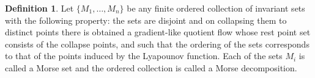 \documentclass{scrartcl}
\theoremstyle{definition}
\newtheorem{definition}{Definition}
\theoremstyle{remark}
\begin{document}
\begin{definition}
Let $\{M_1, \dots, M_n\}$ be any finite ordered collection of invariant sets with the following property: the sets are disjoint and on collapsing them to distinct points there is obtained a gradient-like quotient flow whose rest point set consists of the collapse points, and such that the ordering of the sets corresponds to that of the points induced by the Lyapounov function.
 Each of the sets $M_i$ is called a Morse set and the ordered collection is called a Morse decomposition.
\end{definition}




 \newpage
 
 
\end{document}
